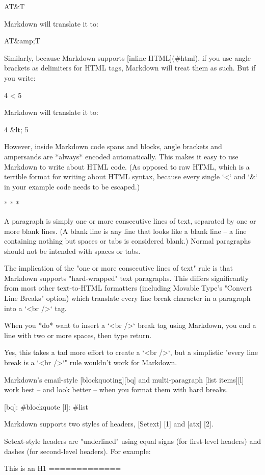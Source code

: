     AT&T

Markdown will translate it to:

    AT&amp;T

Similarly, because Markdown supports [inline HTML](#html), if you use angle brackets as delimiters for HTML tags, Markdown will treat them as such. But if you write:

    4 < 5

Markdown will translate it to:

    4 &lt; 5

However, inside Markdown code spans and blocks, angle brackets and ampersands are *always* encoded automatically. This makes it easy to use Markdown to write about HTML code. (As opposed to raw HTML, which is a terrible format for writing about HTML syntax, because every single `<` and `&` in your example code needs to be escaped.)

* * *

A paragraph is simply one or more consecutive lines of text, separated by one or more blank lines. (A blank line is any line that looks like a blank line -- a line containing nothing but spaces or tabs is considered blank.) Normal paragraphs should not be intended with spaces or tabs.

The implication of the "one or more consecutive lines of text" rule is that Markdown supports "hard-wrapped" text paragraphs. This differs significantly from most other text-to-HTML formatters (including Movable Type's "Convert Line Breaks" option) which translate every line break character in a paragraph into a `<br />` tag.

When you *do* want to insert a `<br />` break tag using Markdown, you end a line with two or more spaces, then type return.

Yes, this takes a tad more effort to create a `<br />`, but a simplistic "every line break is a `<br />`" rule wouldn't work for Markdown.

Markdown's email-style [blockquoting][bq] and multi-paragraph [list items][l] work best -- and look better -- when you format them with hard breaks.

  [bq]: #blockquote
  [l]:  #list

Markdown supports two styles of headers, [Setext] [1] and [atx] [2].

Setext-style headers are "underlined" using equal signs (for first-level headers) and dashes (for second-level headers). For example:

    This is an H1
    =============

